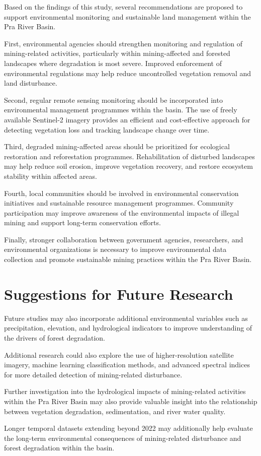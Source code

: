 \documentclass[a4paper,12pt]{report}
\begin{document}
Based on the findings of this study, several recommendations are proposed to support environmental monitoring and sustainable land management within the Pra River Basin.

First, environmental agencies should strengthen monitoring and regulation of mining-related activities, particularly within mining-affected and forested landscapes where degradation is most severe. Improved enforcement of environmental regulations may help reduce uncontrolled vegetation removal and land disturbance.

Second, regular remote sensing monitoring should be incorporated into environmental management programmes within the basin. The use of freely available Sentinel-2 imagery provides an efficient and cost-effective approach for detecting vegetation loss and tracking landscape change over time.

Third, degraded mining-affected areas should be prioritized for ecological restoration and reforestation programmes. Rehabilitation of disturbed landscapes may help reduce soil erosion, improve vegetation recovery, and restore ecosystem stability within affected areas.

Fourth, local communities should be involved in environmental conservation initiatives and sustainable resource management programmes. Community participation may improve awareness of the environmental impacts of illegal mining and support long-term conservation efforts.

Finally, stronger collaboration between government agencies, researchers, and environmental organizations is necessary to improve environmental data collection and promote sustainable mining practices within the Pra River Basin.

\section{Suggestions for Future Research}

Future studies may also incorporate additional environmental variables such as precipitation, elevation, and hydrological indicators to improve understanding of the drivers of forest degradation.

Additional research could also explore the use of higher-resolution satellite imagery, machine learning classification methods, and advanced spectral indices for more detailed detection of mining-related disturbance.

Further investigation into the hydrological impacts of mining-related activities within the Pra River Basin may also provide valuable insight into the relationship between vegetation degradation, sedimentation, and river water quality.

Longer temporal datasets extending beyond 2022 may additionally help evaluate the long-term environmental consequences of mining-related disturbance and forest degradation within the basin.





\end{document}
